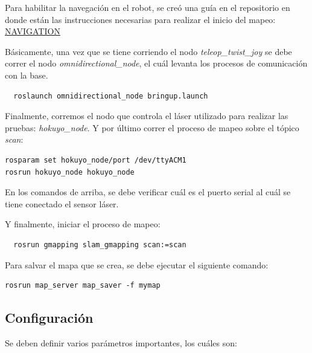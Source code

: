 Para habilitar la navegación en el robot, se creó una guía en el repositorio
en donde están las instrucciones necesarias para realizar el inicio del
mapeo: \href{https://gitlab.com/arcoslab/omnidirectional\_robot/blob/develop/NAVIGATION\_SETUP.md}{NAVIGATION}

Básicamente, una vez que se tiene corriendo el nodo \textit{teleop\_twist\_joy}
se debe correr el nodo \textit{omnidirectional\_node}, el cuál levanta
los procesos de comunicación con la base.

\begin{lstlisting}
  roslaunch omnidirectional_node bringup.launch
\end{lstlisting}

Finalmente, corremos el nodo que controla el láser utilizado para realizar las
pruebas: \textit{hokuyo\_node}. Y por último correr el proceso de mapeo
sobre el tópico \textit{scan}:

\begin{lstlisting}
rosparam set hokuyo_node/port /dev/ttyACM1
rosrun hokuyo_node hokuyo_node
\end{lstlisting}

En los comandos de arriba, se debe verificar cuál es el puerto serial al
cuál se tiene conectado el sensor láser.

Y finalmente, iniciar el proceso de mapeo:

\begin{lstlisting}
  rosrun gmapping slam_gmapping scan:=scan
\end{lstlisting}

Para salvar el mapa que se crea, se debe ejecutar el siguiente comando:

\begin{lstlisting}
rosrun map_server map_saver -f mymap
\end{lstlisting}

\subsection{Configuración}

Se deben definir varios parámetros importantes, los cuáles son:

